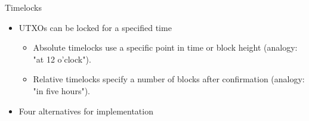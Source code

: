 \documentclass[handout]{beamer}
\begin{document}
\begin{frame}{Timelocks}
	\begin{itemize}
		\item<1-> UTXOs can be locked for a specified time
		\begin{itemize}
			\item<1-> Absolute timelocks use a specific point in time or block height (analogy: "at 12 o'clock").
			\item<1-> Relative timelocks specify a number of blocks after confirmation (analogy: "in five hours").
		\end{itemize}
		\item<2 -> Four alternatives for implementation
	\end{itemize}
	\vspace{0.25cm}
\end{frame}

\end{document}
